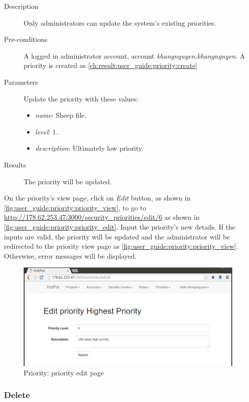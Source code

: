 \begin{description}
\item[Description] Only administrators can update the system's existing priorities.
\item[Pre-conditions] A logged in administrator account, \eg account \emph{khangnguyen:khangnguyen}.
A priority is created as \autoref{ch:result:user_guide:priority:create}
\item[Parameters] Update the priority with these values:
\begin{itemize}
\item \emph{name}: Sheep file.
\item \emph{level}: 1.
\item \emph{description}: Ultimately low priority.
\end{itemize}
\item[Results] The priority will be updated.
\end{description}

On the priority's view page, click on \emph{Edit} button, as shown in \autoref{fig:user_guide:priority:priority_view}, 
to go to \href{http://178.62.253.47:3000/security\_priorities/edit/6}{http://178.62.253.47:3000/security\_priorities/edit/6} as shown in \autoref{fig:user_guide:priority:priority_edit}.
Input the priority's new details.
If the inputs are valid, the priority will be updated and the administrator will be redirected to the priority view page as \autoref{fig:user_guide:priority:priority_view}.
Otherwise, error messages will be displayed.

\begin{figure}[bth]
\myfloatalign
\includegraphics[width=1.0\linewidth]{gfx/chapter_5/priority/priority_edit}
\caption[Priority: priority edit page]{Priority: priority edit page}
\label{fig:user_guide:priority:priority_edit}
\end{figure}

\subsubsection{Delete}
\label{ch:result:user_guide:priority:delete}

